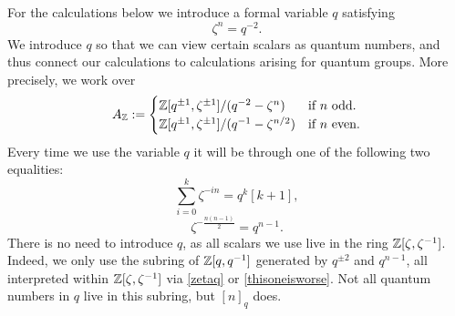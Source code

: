 
For the calculations below we introduce a formal variable $q$ satisfying 
\begin{equation} \label{zetaq} \zeta^n = q^{-2}. \end{equation} We introduce $q$ so that we can view certain scalars as quantum numbers, and thus connect our calculations to calculations arising for quantum groups. 
More precisely, we work over 
\begin{equation}\label{eq coefficient ring with q and zeta}
    A_{\mathbb{Z}}:= \begin{cases}
\mathbb{Z}[q^{\pm 1}, \zeta^{\pm 1}]/(q^{-2}-\zeta^n) &\text{if $n$ odd.}\\
\mathbb{Z}[q^{\pm 1}, \zeta^{\pm 1}]/(q^{-1}-\zeta^{n/2}) &\text{if $n$ even.}
    \end{cases}
\end{equation}
Every time we use the variable $q$ it will be through one of the following two equalities:
\begin{equation} \sum_{i=0}^{k} \zeta^{-in} = q^k [k+1], \end{equation}
\begin{equation} \label{thisoneisworse} \zeta^{-\frac{n(n-1)}{2}} = q^{n-1}. \end{equation}
There is no need to introduce $q$, as all scalars we use live in the ring $\mathbb{Z}[\zeta,\zeta^{-1}]$. Indeed, we only use the subring of $\mathbb{Z}[q,q^{-1}]$ generated by $q^{\pm 2}$ and $q^{n-1}$, all interpreted within $\mathbb{Z}[\zeta,\zeta^{-1}]$ via \eqref{zetaq} or \eqref{thisoneisworse}. Not all quantum numbers in $q$ live in this subring, but $[n]_q$ does.


